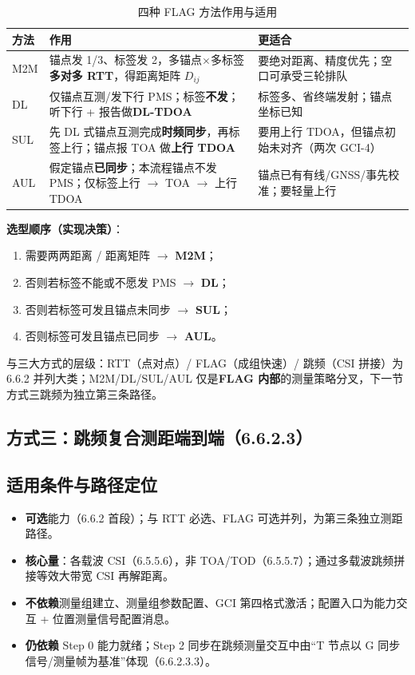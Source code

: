 \documentclass[11pt,a4paper]{ctexart}
\begin{document}
\begin{longtable}{L{2cm}L{5.2cm}L{5.5cm}}
\caption{四种 FLAG 方法作用与适用\label{tab:step110}} \\
\toprule
\textbf{方法} & \textbf{作用} & \textbf{更适合} \\
\midrule
M2M & 锚点发 1/3、标签发 2，多锚点$\times$多标签\textbf{多对多 RTT}，得距离矩阵 $D_{ij}$ & 要绝对距离、精度优先；空口可承受三轮排队 \\
DL & 仅锚点互测/发下行 PMS；标签\textbf{不发}；听下行 + 报告做\textbf{DL-TDOA} & 标签多、省终端发射；锚点坐标已知 \\
SUL & 先 DL 式锚点互测完成\textbf{时频同步}，再标签上行；锚点报 TOA 做\textbf{上行 TDOA} & 要用上行 TDOA，但锚点初始未对齐（两次 GCI-4） \\
AUL & 假定锚点\textbf{已同步}；本流程锚点不发 PMS；仅标签上行 $\rightarrow$ TOA $\rightarrow$ 上行 TDOA & 锚点已有有线/GNSS/事先校准；要轻量上行 \\
\bottomrule
\end{longtable}

\textbf{选型顺序（实现决策）}：
\begin{enumerate}[nosep]
  \item 需要两两距离 / 距离矩阵 $\rightarrow$ \textbf{M2M}；
  \item 否则若标签不能或不愿发 PMS $\rightarrow$ \textbf{DL}；
  \item 否则若标签可发且锚点未同步 $\rightarrow$ \textbf{SUL}；
  \item 否则标签可发且锚点已同步 $\rightarrow$ \textbf{AUL}。
\end{enumerate}

与三大方式的层级：RTT（点对点）/ FLAG（成组快速）/ 跳频（CSI 拼接）为 6.6.2 并列大类；M2M/DL/SUL/AUL 仅是\textbf{FLAG 内部}的测量策略分叉，下一节方式三跳频为独立第三条路径。

\subsection{方式三：跳频复合测距端到端（6.6.2.3）}

\subsection{适用条件与路径定位}

\begin{itemize}[nosep]
  \item \textbf{可选}能力（6.6.2 首段）；与 RTT 必选、FLAG 可选并列，为第三条独立测距路径。
  \item \textbf{核心量}：各载波 CSI（6.5.5.6），非 TOA/TOD（6.5.5.7）；通过多载波跳频拼接等效大带宽 CSI 再解距离。
  \item \textbf{不依赖}测量组建立、测量组参数配置、GCI 第四格式激活；配置入口为能力交互 + 位置测量信号配置消息。
  \item \textbf{仍依赖} Step 0 能力就绪；Step 2 同步在跳频测量交互中由``T 节点以 G 同步信号/测量帧为基准''体现（6.6.2.3.3）。
\end{itemize}
\end{document}

